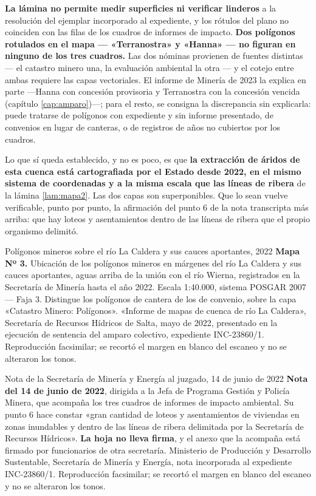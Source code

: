 \begin{cautela}
\textbf{La lámina no permite medir superficies ni verificar linderos} a la resolución del
ejemplar incorporado al expediente, y los rótulos del plano no coinciden con las filas de
los cuadros de informes de impacto. \textbf{Dos polígonos rotulados en el mapa ---
«Terranostra» y «Hanna» --- no figuran en ninguno de los tres cuadros.} Las dos nóminas
provienen de fuentes distintas --- el catastro minero una, la evaluación ambiental la otra ---
y el cotejo entre ambas requiere las capas vectoriales. El informe de Minería de 2023 la explica en parte ---Hanna con concesión provisoria y Terranostra con la concesión vencida (capítulo \ref{cap:amparo})---; para el resto, se consigna la discrepancia sin
explicarla: puede tratarse de polígonos con expediente y sin informe presentado, de convenios
en lugar de canteras, o de registros de años no cubiertos por los cuadros.

Lo que sí queda establecido, y no es poco, es que \textbf{la extracción de áridos de esta
cuenca está cartografiada por el Estado desde 2022, en el mismo sistema de coordenadas y a la
misma escala que las líneas de ribera} de la lámina \ref{lam:mapa2}. Las dos capas son
superponibles. Que lo sean vuelve verificable, punto por punto, la afirmación del punto 6 de
la nota transcripta más arriba: que hay loteos y asentamientos dentro de las líneas de ribera
que el propio organismo delimitó.
\end{cautela}

%
{Polígonos mineros sobre el río La Caldera y sus cauces aportantes, 2022}%
{\textbf{Mapa Nº 3.} Ubicación de los polígonos mineros en márgenes del río La Caldera y sus
cauces aportantes, aguas arriba de la unión con el río Wierna, registrados en la Secretaría de
Minería hasta el año 2022. Escala 1:40.000, sistema POSGAR 2007 --- Faja 3. Distingue los
polígonos de cantera de los de convenio, sobre la capa «Catastro Minero: Polígonos».}%
{«Informe de mapas de cuenca de río La Caldera», Secretaría de Recursos Hídricos de Salta, mayo
de 2022, presentado en la ejecución de sentencia del amparo colectivo, expediente
INC-23860/1. Reproducción facsimilar; se recortó el margen en blanco del escaneo y no se
alteraron los tonos.}

%
{Nota de la Secretaría de Minería y Energía al juzgado, 14 de junio de 2022}%
{\textbf{Nota del 14 de junio de 2022}, dirigida a la Jefa de Programa Gestión y Policía Minera, que acompaña los tres cuadros de informes de impacto ambiental. Su punto 6 hace constar «gran cantidad de loteos y asentamientos de viviendas en zonas inundables y dentro de las líneas de ribera delimitada por la Secretaría de Recursos Hídricos». \textbf{La hoja no lleva firma}, y el anexo que la acompaña está firmado por funcionarios de otra secretaría.}%
{Ministerio de Producción y Desarrollo Sustentable, Secretaría de Minería y Energía, nota incorporada al expediente INC-23860/1. Reproducción facsimilar; se recortó el margen en blanco del escaneo y no se alteraron los tonos.}


